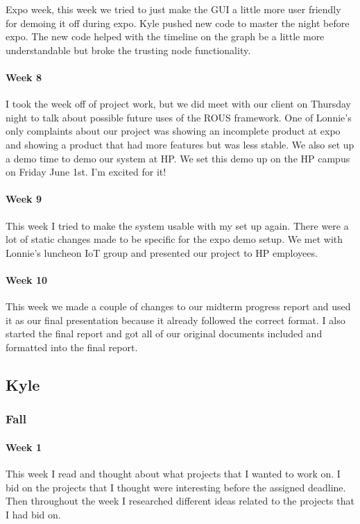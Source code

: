 \documentclass[draftclsnofoot, onecolumn, compsoc, 10pt]{IEEEtran}
\begin{document}
Expo week, this week we tried to just make the GUI a little more user friendly for demoing it off during expo. Kyle pushed new code to master the night before expo. The new code helped with the timeline on the graph be a little more understandable but broke the trusting node functionality.
\paragraph{Week 8}
I took the week off of project work, but we did meet with our client on Thursday night to talk about possible future uses of the ROUS framework. One of Lonnie's only complaints about our project was showing an incomplete product at expo and showing a product that had more features but was less stable. We also set up a demo time to demo our system at HP. We set this demo up on the HP campus on Friday June 1st. I'm excited for it! 
\paragraph{Week 9}
This week I tried to make the system usable with my set up again. There were a lot of static changes made to be specific for the expo demo setup. We met with Lonnie's luncheon IoT group and presented our project to HP employees.
\paragraph{Week 10}
This week we made a couple of changes to our midterm progress report and used it as our final presentation because it already followed the correct format. I also started the final report and got all of our original documents included and formatted into the final report. 



\subsection{Kyle}
\subsubsection{Fall}
\paragraph{Week 1}
This week I read and thought about what projects that I wanted to work on. I bid on the projects that I thought were interesting before the assigned deadline. Then throughout the week I researched different ideas related to the projects that I had bid on. 
\end{document}
